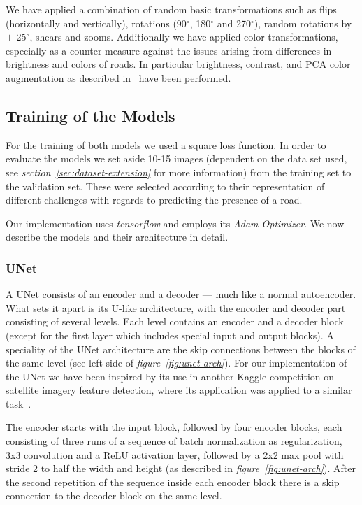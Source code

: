 \documentclass[10pt,conference,compsocconf]{IEEEtran}
\begin{document}
We have applied a combination of random basic transformations such as flips (horizontally and vertically), rotations (90$^{\circ}$, 180$^{\circ}$ and 270$^{\circ}$), random rotations by $\pm$ 25$^{\circ}$, shears and zooms. Additionally we have applied color transformations, especially as a counter measure against the issues arising from differences in brightness and colors of roads. In particular brightness, contrast, and PCA color augmentation as described in~\cite{NIPS2012_4824} have been performed.

\subsection{Training of the Models}
For the training of both models we used a square loss function. In order to evaluate the models we set aside 10-15 images (dependent on the data set used, see \textit{section~\ref{sec:dataset-extension}} for more information) from the training set to the validation set. These were selected according to their representation of different challenges with regards to predicting the presence of a road.

Our implementation uses \textit{tensorflow} and employs its \textit{Adam Optimizer}. We now describe the models and their architecture in detail.\\

\subsubsection{UNet}
A UNet consists of an encoder and a decoder --- much like a normal autoencoder. What sets it apart is its U-like architecture, with the encoder and decoder part consisting of several levels. Each level contains an encoder and a decoder block (except for the first layer which includes special input and output blocks). A speciality of the UNet architecture are the skip connections between the blocks of the same level (see left side of \textit{figure~\ref{fig:unet-arch}}). For our implementation of the UNet we have been inspired by its use in another Kaggle competition on satellite imagery feature detection, where its application was applied to a similar task~\cite{Dstl}.

The encoder starts with the input block, followed by four encoder blocks, each consisting of three runs of a sequence of batch normalization as regularization, 3x3 convolution and a ReLU activation layer, followed by a 2x2 max pool with stride 2 to half the width and height (as described in \textit{figure~\ref{fig:unet-arch}}). After the second repetition of the sequence inside each encoder block there is a skip connection to the decoder block on the same level.
\end{document}
